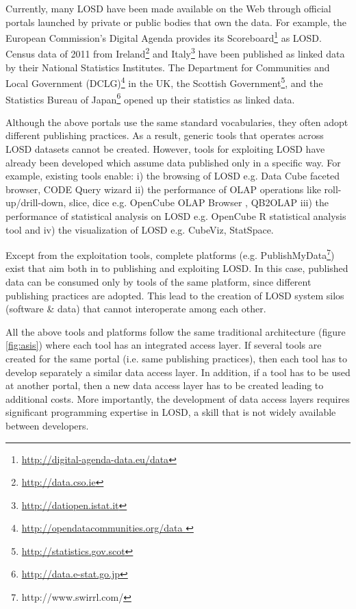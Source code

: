 \documentclass{llncs}
\begin{document}
Currently, many LOSD have been made available on the Web through official portals launched by private or public bodies that own the data. For example, the European Commission's Digital Agenda provides its Scoreboard\footnote{\url{http://digital-agenda-data.eu/data}} as LOSD. Census data of 2011 from Ireland\footnote{\url{http://data.cso.ie}} and Italy\footnote{\url{http://datiopen.istat.it}} have been published as linked data by their National Statistics Institutes. The Department for Communities and Local Government (DCLG)\footnote{\url{http://opendatacommunities.org/data }} in the UK, the Scottish Government\footnote{\url{http://statistics.gov.scot}}, and the Statistics Bureau of Japan\footnote{\url{http://data.e-stat.go.jp}} opened up their statistics as linked data. 

Although the above portals use the same standard vocabularies, they often adopt different publishing practices. As a result, generic tools that operates across LOSD datasets cannot be created. However, tools for exploiting LOSD have already been developed which assume data published only in a specific way. For example, existing tools enable: i) the browsing of LOSD e.g. Data Cube faceted browser\cite{Maali}, CODE Query wizard\cite{CODE:2014} ii) the performance of OLAP operations like roll-up/drill-down, slice, dice e.g. OpenCube OLAP Browser \cite{KalampokisIAOS}, QB2OLAP\cite{QB2OLAP} iii) the performance of  statistical analysis on LOSD e.g. OpenCube R statistical analysis tool\cite{Kalampokis:2014} and iv) the visualization of LOSD e.g. CubeViz\cite{Cubeviz}, StatSpace\cite{Statspace}.

Except from the exploitation tools, complete platforms (e.g. PublishMyData\footnote{http://www.swirrl.com/}) exist that aim both in to publishing and exploiting LOSD. In this case, published data can be consumed only by tools of the same platform, since different publishing practices are adopted. This lead to the creation of LOSD system silos (software \& data) that cannot interoperate among each other.

All the above tools and platforms follow the same traditional architecture (figure \ref{fig:asis}) where each tool has an integrated access layer. If several tools are created for the same portal (i.e. same publishing practices), then each tool has to develop separately  a similar data access layer. In addition, if a tool has to be used at another portal, then a new data access layer has to be created leading to additional costs. More importantly, the development of data access layers requires significant programming expertise in LOSD, a skill that is not widely available between developers.
\end{document}
